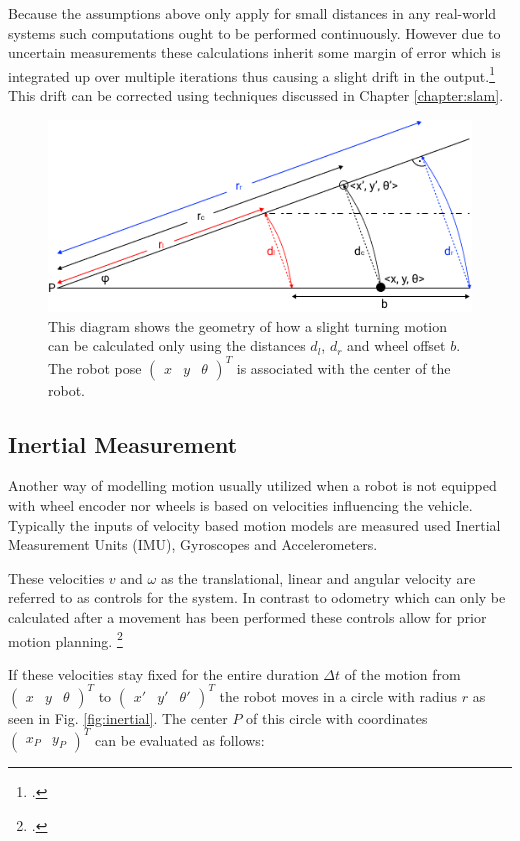 Because the assumptions above only apply for small distances in any real-world systems such computations ought to be performed continuously. However due to uncertain measurements these calculations inherit some margin of error which is integrated up over multiple iterations thus causing a slight drift in the output.\footcite[Pages 69 - 77]{ben2017elements} 
This drift can be corrected using techniques discussed in Chapter \ref{chapter:slam}.

\begin{figure}
	\centering
	\includegraphics[width=0.8\linewidth]{img/odom}
	\caption{
		This diagram shows the geometry of how a slight turning motion can be calculated only using the distances $d_{l}$, $d_{r}$ and wheel offset $b$.
		The robot pose 
		$
			\begin{pmatrix}
				x &
				y &
				\theta 
			\end{pmatrix}^{T}
		$
		is associated with the center of the robot.
	}
	\label{fig:odom}
\end{figure}


\subsection{Inertial Measurement}
Another way of modelling motion usually utilized when a robot is not equipped with wheel encoder nor wheels is based on velocities influencing the vehicle. Typically the inputs of velocity based motion models are measured used Inertial Measurement Units (IMU), Gyroscopes and Accelerometers. 

These velocities $v$ and $\omega$ as the translational, linear and angular velocity are referred to as controls for the system. 
In contrast to odometry which can only be calculated after a movement has been performed these controls allow for prior motion planning. \footcite[Pages 92 - 99]{thrun2002probabilisticRobotics}

If these velocities stay fixed for the entire duration $\Delta t$ of the motion from 
$\begin{pmatrix} x & y & \theta \end{pmatrix}^{T}$
to
$\begin{pmatrix} x' & y' & \theta' \end{pmatrix}^{T}$
the robot moves in a circle with radius $r$ as seen in Fig. \ref{fig:inertial}. The center $P$ of this circle with coordinates 
$
\begin{pmatrix}
	x_{P} & y_{P}
\end{pmatrix}
^{T}
$
can be evaluated as follows:

